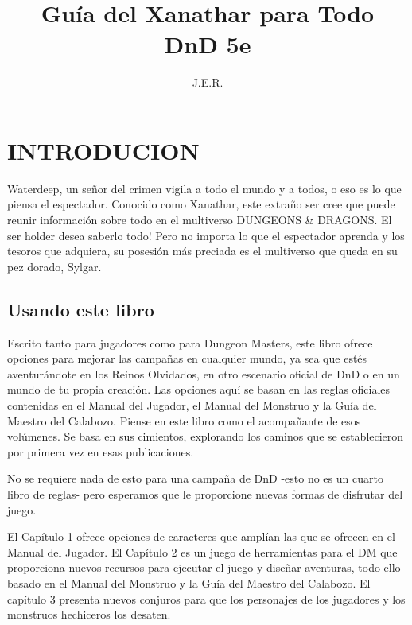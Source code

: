 \documentclass[a4paper,twocolumn,openany,10pt]{dndbook}
\title{Guía del Xanathar para Todo \\
\large DnD 5e}
\author{J.E.R.}
\begin{document}
\frontmatter

\maketitle

\tableofcontents

\mainmatter%

\newpage

\chapter{INTRODUCION}

 Waterdeep, un señor del crimen vigila a todo el mundo y a todos,
o eso es lo que piensa el espectador. Conocido como Xanathar, este extraño ser cree que puede reunir información sobre
todo en el multiverso DUNGEONS \& DRAGONS. El ser holder desea saberlo todo! Pero no importa lo que el espectador aprenda
y los tesoros que adquiera, su posesión más preciada es el multiverso que queda en su pez dorado, Sylgar.

\section{Usando este libro}
Escrito tanto para jugadores como para Dungeon Masters, este libro ofrece opciones para mejorar las campañas en cualquier
mundo, ya sea que estés aventurándote en los Reinos Olvidados, en otro escenario oficial de DnD o en un mundo de tu propia
creación. Las opciones aquí se basan en las reglas oficiales contenidas en el Manual del Jugador, el Manual del Monstruo y la
Guía del Maestro del Calabozo. Piense en este libro como el acompañante de esos volúmenes. Se basa en sus cimientos, explorando
los caminos que se establecieron por primera vez en esas publicaciones.

No se requiere nada de esto para una campaña de DnD -esto no es un cuarto libro de reglas- pero esperamos que le proporcione
nuevas formas de disfrutar del juego.

El Capítulo 1 ofrece opciones de caracteres que amplían las que se ofrecen en el Manual del Jugador. El Capítulo 2 es un juego 
de herramientas para el DM que proporciona nuevos recursos para ejecutar el juego y diseñar aventuras, todo ello basado en el
Manual del Monstruo y la Guía del Maestro del Calabozo. El capítulo 3 presenta nuevos conjuros para que los personajes de los
jugadores y los monstruos hechiceros los desaten.
\end{document}
